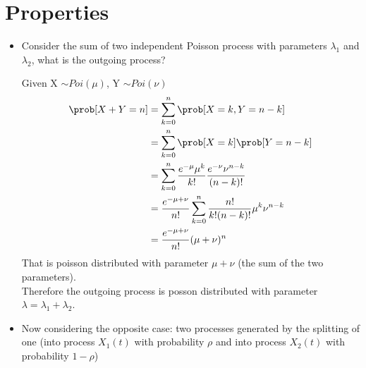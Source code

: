 \section{Properties}
\begin{itemize}
  \item Consider the sum of two independent Poisson process with parameters $\lambda_1$ and $\lambda_2$, what is the outgoing process?
        \begin{figure}[H]
          \centering
        \end{figure}
          Given X $\sim Poi(\mu)$, Y $\sim Poi(\nu)$
          \begin{equation}
            \begin{split}
  	           \prob[X + Y = n] &=  \sum\limits_{k=0}^n \prob[X = k, Y = n - k] \\
               &=  \sum\limits_{k=0}^n \prob[X = k] \prob[Y = n - k] \\
               &=  \sum\limits_{k=0}^n \frac{e^{-\mu} \mu^k}{k!} \frac{e^{-\nu}\nu^{n-k}}{(n-k)!}\\
               &=  \frac{e^{-\mu + \nu}}{n!}\sum\limits_{k=0}^n \frac{n!}{k!(n-k)!}\mu^k\nu^{n-k}\\
               &=  \frac{e^{-\mu + \nu}}{n!}(\mu + \nu)^n
             \end{split}
           \end{equation}
           That is poisson distributed with parameter $\mu + \nu$ (the sum of the two parameters). \\
           Therefore the outgoing process is posson distributed with parameter $\lambda = \lambda_1 + \lambda_2$.
     \item Now considering the opposite case: two processes generated by the splitting of one (into process $X_1(t)$ with probability $\rho$ and into process $X_2(t)$ with probability $1-\rho$)
           \begin{figure}[H]
                  \centering

\end{figure}
\end{itemize}
